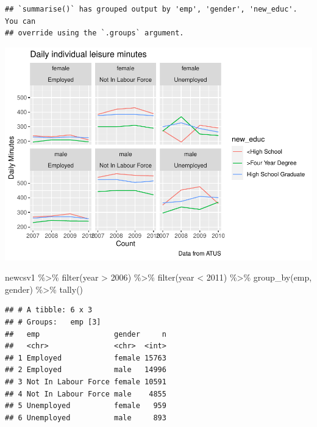 \documentclass[
]{article}
\newenvironment{Shaded}{\begin{snugshade}}{\end{snugshade}}
\newcommand{\DecValTok}[1]{\textcolor[rgb]{0.00,0.00,0.81}{#1}}
\newcommand{\FunctionTok}[1]{\textcolor[rgb]{0.00,0.00,0.00}{#1}}
\newcommand{\NormalTok}[1]{#1}
\newcommand{\SpecialCharTok}[1]{\textcolor[rgb]{0.00,0.00,0.00}{#1}}
\begin{document}
\begin{verbatim}
## `summarise()` has grouped output by 'emp', 'gender', 'new_educ'. You can
## override using the `.groups` argument.
\end{verbatim}

\includegraphics{Paper2_files/figure-latex/employment-4.pdf}

\begin{Shaded}
\begin{Highlighting}[]
\NormalTok{newcsv1 }\SpecialCharTok{\%\textgreater{}\%}
  \FunctionTok{filter}\NormalTok{(year }\SpecialCharTok{\textgreater{}} \DecValTok{2006}\NormalTok{) }\SpecialCharTok{\%\textgreater{}\%}
  \FunctionTok{filter}\NormalTok{(year }\SpecialCharTok{\textless{}} \DecValTok{2011}\NormalTok{) }\SpecialCharTok{\%\textgreater{}\%}
  \FunctionTok{group\_by}\NormalTok{(emp, gender) }\SpecialCharTok{\%\textgreater{}\%}
  \FunctionTok{tally}\NormalTok{()}
\end{Highlighting}
\end{Shaded}

\begin{verbatim}
## # A tibble: 6 x 3
## # Groups:   emp [3]
##   emp                 gender     n
##   <chr>               <chr>  <int>
## 1 Employed            female 15763
## 2 Employed            male   14996
## 3 Not In Labour Force female 10591
## 4 Not In Labour Force male    4855
## 5 Unemployed          female   959
## 6 Unemployed          male     893
\end{verbatim}
\end{document}
